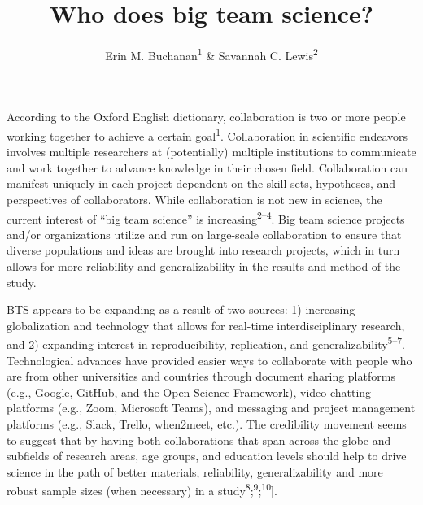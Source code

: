 \documentclass[
  man,floatsintext]{apa6}
\title{Who does big team science?}
\author{Erin M. Buchanan\textsuperscript{1} \& Savannah C. Lewis\textsuperscript{2}}
\date{}
\affiliation{\vspace{0.5cm}\textsuperscript{1} Harrisburg University of Science and Technology\\\textsuperscript{2} University of Alabama}
\begin{document}
\maketitle

According to the Oxford English dictionary, collaboration is two or more
people working together to achieve a certain goal\textsuperscript{1}.
Collaboration in scientific endeavors involves multiple researchers at
(potentially) multiple institutions to communicate and work together to
advance knowledge in their chosen field. Collaboration can manifest
uniquely in each project dependent on the skill sets, hypotheses, and
perspectives of collaborators. While collaboration is not new in
science, the current interest of ``big team science'' is increasing\textsuperscript{2--4}. Big team science projects
and/or organizations utilize and run on large-scale collaboration to
ensure that diverse populations and ideas are brought into research
projects, which in turn allows for more reliability and generalizability
in the results and method of the study.

BTS appears to be expanding as a result of two sources: 1) increasing
globalization and technology that allows for real-time interdisciplinary
research, and 2) expanding interest in reproducibility, replication, and
generalizability\textsuperscript{5--7}. Technological
advances have provided easier ways to collaborate with people who are
from other universities and countries through document sharing platforms
(e.g., Google, GitHub, and the Open Science Framework), video chatting
platforms (e.g., Zoom, Microsoft Teams), and messaging and project
management platforms (e.g., Slack, Trello, when2meet, etc.). The
credibility movement seems to suggest that by having both collaborations
that span across the globe and subfields of research areas, age groups,
and education levels should help to drive science in the path of better
materials, reliability, generalizability and more robust sample sizes
(when necessary) in a study\textsuperscript{8};\textsuperscript{9};\textsuperscript{10}{]}.
\end{document}
